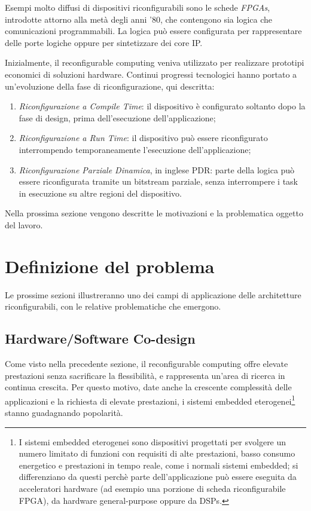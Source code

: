 Esempi molto diffusi di dispositivi riconfigurabili sono le schede \emph{\acp{FPGA}},
introdotte attorno alla metà degli anni '80, che contengono sia logica che comunicazioni
programmabili. La logica può essere configurata per rappresentare delle porte logiche
oppure per sintetizzare dei core \ac{IP}.

Inizialmente, il reconfigurable computing veniva utilizzato per realizzare prototipi
economici di soluzioni hardware. Continui progressi tecnologici hanno portato
a un'evoluzione della fase di riconfigurazione, qui descritta:
\begin{enumerate}
 \item \emph{Riconfigurazione a Compile Time}: il dispositivo è configurato soltanto
dopo la fase di design, prima dell'esecuzione dell'applicazione;
 \item \emph{Riconfigurazione a Run Time}: il dispositivo può essere riconfigurato
interrompendo temporaneamente l'esecuzione dell'applicazione;
 \item \emph{Riconfigurazione Parziale Dinamica}, in inglese \ac{PDR}: parte della logica
può essere riconfigurata tramite un bitstream parziale, senza interrompere i task in
esecuzione su altre regioni del dispositivo.
\end{enumerate}


Nella prossima sezione vengono descritte le motivazioni e la problematica oggetto del
lavoro.

\section{Definizione del problema}
\label{sec:definizioneProblema}
Le prossime sezioni illustreranno uno dei campi di applicazione delle architetture
riconfigurabili, con le relative problematiche che emergono.

\subsection{Hardware/Software Co-design}
Come visto nella precedente sezione, il reconfigurable computing offre elevate
prestazioni senza sacrificare la flessibilità, e rappresenta un'area di
ricerca in continua crescita. Per questo motivo, date anche la crescente complessità
delle applicazioni e la richiesta di elevate prestazioni, i sistemi embedded
eterogenei\footnote{I sistemi embedded eterogenei sono dispositivi progettati per
svolgere un numero limitato di funzioni con requisiti di alte prestazioni, basso consumo
energetico e prestazioni in tempo reale, come i normali sistemi embedded; si
differenziano da questi perchè parte dell'applicazione può essere eseguita da
acceleratori hardware (ad esempio una porzione di scheda riconfigurabile FPGA), da
hardware general-purpose oppure da \acp{DSP}.} stanno guadagnando popolarità.

